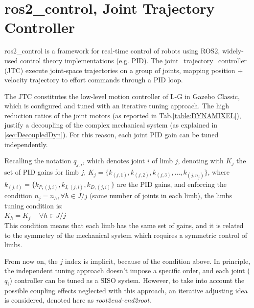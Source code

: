\section{ros2\_control, Joint Trajectory Controller}
\label{sec:ros2_control}

ros2\_control is a framework for real-time control of robots using ROS2, widely-used control theory implementations (e.g. PID). 
The joint\_trajectory\_controller (JTC) execute joint-space trajectories on a group of joints, 
mapping position + velocity trajectory to effort commands through a PID loop.

The JTC constitutes the low-level motion controller of L-G in Gazebo Classic, which is configured and tuned with an iterative tuning approach.  
The high reduction ratios of the joint motors (as reported in Tab.\ref{table:DYNAMIXEL}), justify a decoupling of the complex mechanical system (as explained in \ref{sec:DecoupledDyn}). For this reason, each joint PID gain can be tuned independently. 

Recalling the notation $q_{j,i}$, which denotes joint $i$ of limb $j$, denoting with $K_{j}$ the set of PID gains for limb $j$, $K_{j} = \{k_{(j,1)}, k_{(j,2)}, k_{(j,3)}, \dots, k_{(j,n_j)} \}$, where $k_{(j,i)} = \{ k_{P,(j,i)}, k_{I,(j,i)}, k_{D, (j,i)}\}$ are the PID gains, and enforcing the condition $n_j = n_h , \forall h\in J /j$ (same number of joints in each limb), the limbs tuning condition is: \\
$K_{h} = K_{j} \quad\ \forall h \in J/j$\\
This condition means that each limb has the same set of gains, and it is related to the symmetry of the mechanical system which requires a symmetric control of limbs. 

From now on, the $j$ index is implicit, because of the condition above.
In principle, the independent tuning approach doesn't impose a specific order, and each joint ($q_i$) controller can be tuned as a SISO system. 
However, to take into account the possible coupling effects neglected with this approach, an iterative adjusting idea is considered, denoted here as \textit{root2end-end2root}.

